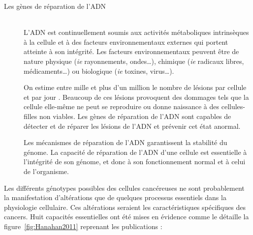 			\begin{description}
				\item [Les gènes de réparation de l'\acs{ADN}]  \hfill \\
					L'\acs{ADN} est continuellement soumis aux activités métaboliques intrinsèques à la cellule et à des facteurs environnementaux externes qui portent atteinte à son intégrité.
					Les facteurs environnementaux peuvent être de nature physique (\emph{ie} rayonnements, ondes\dots), chimique (\emph{ie} radicaux libres, médicaments\dots) ou biologique (\emph{ie} toxines, virus\dots).

					On estime entre mille et plus d'un million le nombre de lésions par cellule et par jour \citep{Ames1993}.
					Beaucoup de ces lésions provoquent des dommages tels que la cellule elle-même ne peut se reproduire ou donne naissance à des cellules-filles non viables.
					Les gènes de réparation de l'\acs{ADN} sont capables de détecter et de réparer les lésions de l'\acs{ADN} et prévenir cet état anormal.

					Les mécanismes de réparation de l'\acs{ADN} garantissent la stabilité du génome.
					La capacité de réparation de l'\acs{ADN} d'une cellule est essentielle à l'intégrité de son génome, et donc à son fonctionnement normal et à celui de l'organisme.
			\end{description}
			\vspace{1.5ex}

			Les différents génotypes possibles des cellules cancéreuses ne sont probablement la manifestation d'altérations que de quelques processus essentiels dans la physiologie cellulaire.
			Ces altérations seraient les caractéristiques spécifiques des cancers.
			Huit capacités essentielles ont été mises en évidence comme le détaille la figure~\ref{fig:Hanahan2011} reprenant les publications \citet{Hanahan2000,Hanahan2011} :

			\begin{sidewaysfigure}
				\begin{center}
					\def\svgwidth{\columnwidth}
					
					\caption{Caractéristiques du Cancer inspiré de \citet{Hanahan2000,Hanahan2011}.}
					\label{fig:Hanahan2011}
				\end{center}
			\end{sidewaysfigure}

